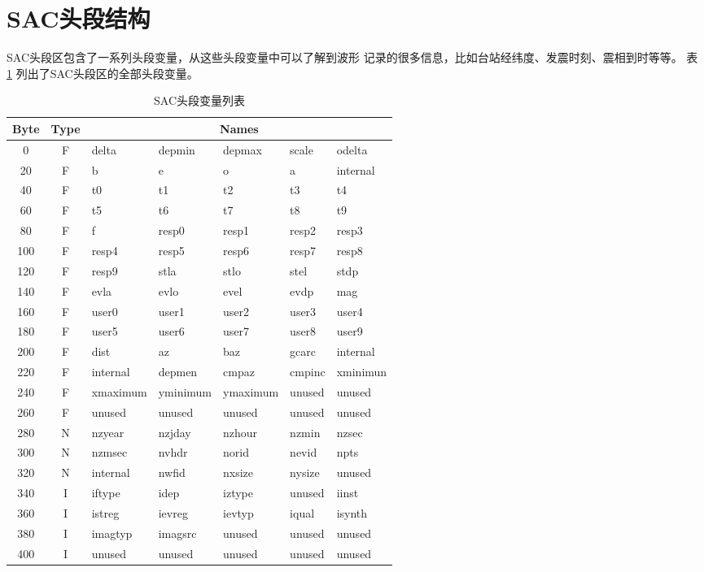 \section{SAC头段结构}
SAC头段区包含了一系列头段变量，从这些头段变量中可以了解到波形
记录的很多信息，比如台站经纬度、发震时刻、震相到时等等。
表 \ref{table:header-variables} 列出了SAC头段区的全部头段变量。

\begin{table}[H]
\ttfamily
\small
\centering
\caption{SAC头段变量列表}
\label{table:header-variables}
\begin{tabular}{c|c|lllll}
	\toprule
    Byte	&	Type	&	\multicolumn{5}{c}{Names}\\
	\midrule
	0		&	F	&	delta	&	depmin	&	depmax	&	scale	&	odelta	\\
	20		&	F	&	b		&	e		&	o		&	a		&	internal\\
	40		&	F	&	t0		&	t1		&	t2		&	t3		&	t4		\\
	60		&	F	&	t5		&	t6		&	t7		&	t8		&	t9		\\
	80		&	F	&	f		&	resp0	&	resp1	&	resp2	&	resp3	\\
	100		&	F	&	resp4	&	resp5	&	resp6	&	resp7	&	resp8	\\
    120		&	F	&	resp9	&	stla	&	stlo	&	stel	&	stdp	\\
	140		&	F	&	evla	&	evlo	&	evel	&	evdp	&	mag		\\
	160		&	F	&	user0	&	user1	&	user2	&	user3	&	user4	\\
	180		&	F	&	user5	&	user6	&	user7	&	user8	&	user9	\\
	200		&	F	&	dist	&	az		&	baz		&	gcarc	&	internal\\
	220		&	F	&	internal&	depmen	&	cmpaz	&	cmpinc	&	xminimun\\
	240		&	F	&	xmaximum&	yminimum&	ymaximum&	unused	&	unused	\\
	260		&	F	&	unused	&	unused	&	unused	&	unused	&	unused	\\
	280		&	N	&	nzyear	&	nzjday	&	nzhour	&	nzmin	&	nzsec	\\
	300		&	N	&	nzmsec	&	nvhdr	&	norid	&	nevid	&	npts	\\
	320		&	N	&	internal&	nwfid	&	nxsize	&	nysize	&	unused	\\
	340		&	I	&	iftype	&	idep	&	iztype	&	unused	&	iinst	\\
	360		&	I	&	istreg	&	ievreg	&	ievtyp	&	iqual	&	isynth	\\
    380		&	I	&	imagtyp &	imagsrc	&	unused	&	unused	&	unused	\\
	400		&	I	&	unused	&	unused	&	unused	&	unused	&	unused	\\

\end{tabular}
\end{table}
